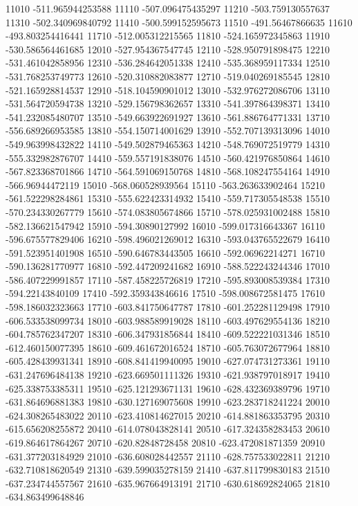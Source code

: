 {11010 -511.965944253588
11110 -507.096475435297
11210 -503.759130557637
11310 -502.340969840792
11410 -500.599152595673
11510 -491.56467866635
11610 -493.803254416441
11710 -512.005312215565
11810 -524.165972345863
11910 -530.586564461685
12010 -527.954367547745
12110 -528.950791898475
12210 -531.461042858956
12310 -536.284642051338
12410 -535.368959117334
12510 -531.768253749773
12610 -520.310882083877
12710 -519.040269185545
12810 -521.165928814537
12910 -518.104590901012
13010 -532.976272086706
13110 -531.564720594738
13210 -529.156798362657
13310 -541.397864398371
13410 -541.232085480707
13510 -549.663922691927
13610 -561.886764771331
13710 -556.689266953585
13810 -554.150714001629
13910 -552.707139313096
14010 -549.963998432822
14110 -549.502879465363
14210 -548.769072519779
14310 -555.332982876707
14410 -559.557191838076
14510 -560.421976850864
14610 -567.823368701866
14710 -564.591069150768
14810 -568.108247554164
14910 -566.96944472119
15010 -568.060528939564
15110 -563.263633902464
15210 -561.522298284861
15310 -555.622423314932
15410 -559.717305548538
15510 -570.234330267779
15610 -574.083805674866
15710 -578.025931002488
15810 -582.136621547942
15910 -594.30890127992
16010 -599.017316643367
16110 -596.675577829406
16210 -598.496021269012
16310 -593.043765522679
16410 -591.523951401908
16510 -590.646783443505
16610 -592.06962214271
16710 -590.136281770977
16810 -592.447209241682
16910 -588.522243244346
17010 -586.407229991857
17110 -587.458225726819
17210 -595.893008539384
17310 -594.22143840109
17410 -592.359343846616
17510 -598.008672581475
17610 -598.186032323663
17710 -603.841750647787
17810 -601.252281129498
17910 -606.533538099734
18010 -603.988589919028
18110 -603.497629554136
18210 -604.785762347207
18310 -606.347931856844
18410 -609.522221031346
18510 -612.460150077395
18610 -609.461672016524
18710 -605.763072677964
18810 -605.428439931341
18910 -608.841419940095
19010 -627.074731273361
19110 -631.247696484138
19210 -623.669501111326
19310 -621.938797018917
19410 -625.338753385311
19510 -625.121293671131
19610 -628.432369389796
19710 -631.864696881383
19810 -630.127169075608
19910 -623.283718241224
20010 -624.308265483022
20110 -623.410814627015
20210 -614.881863353795
20310 -615.656208255872
20410 -614.078043828141
20510 -617.324358283453
20610 -619.864617864267
20710 -620.82848728458
20810 -623.472081871359
20910 -631.377203184929
21010 -636.608028442557
21110 -628.757533022811
21210 -632.710818620549
21310 -639.599035278159
21410 -637.811799830183
21510 -637.234744557567
21610 -635.967664913191
21710 -630.618692824065
21810 -634.863499648846
}
